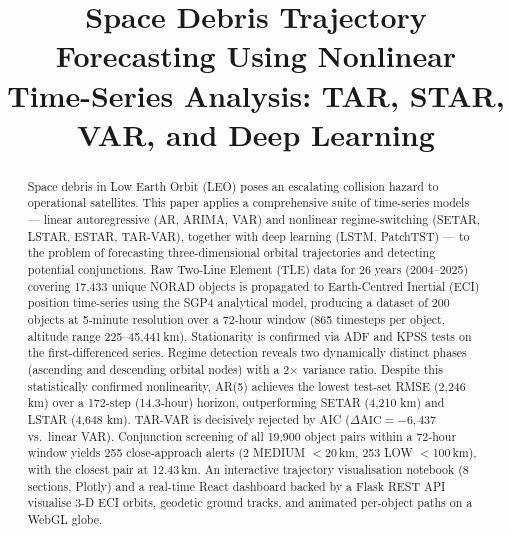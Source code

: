 \documentclass[conference]{IEEEtran}
\begin{document}
\title{Space Debris Trajectory Forecasting Using Nonlinear\\
       Time-Series Analysis: TAR, STAR, VAR, and Deep Learning}

\author{
}

\maketitle

\begin{abstract}
Space debris in Low Earth Orbit (LEO) poses an escalating collision hazard
to operational satellites. This paper applies a comprehensive suite of
time-series models --- linear autoregressive (AR, ARIMA, VAR) and nonlinear
regime-switching (SETAR, LSTAR, ESTAR, TAR-VAR), together with deep learning
(LSTM, PatchTST) --- to the problem of forecasting three-dimensional orbital
trajectories and detecting potential conjunctions. Raw Two-Line Element (TLE)
data for 26 years (2004--2025) covering 17{,}433 unique NORAD objects is
propagated to Earth-Centred Inertial (ECI) position time-series using the
SGP4 analytical model, producing a dataset of 200 objects at 5-minute
resolution over a 72-hour window (865 timesteps per object, altitude range
225--45{,}441\,km). Stationarity is confirmed via ADF and KPSS tests on the
first-differenced series. Regime detection reveals two dynamically distinct
phases (ascending and descending orbital nodes) with a 2$\times$ variance
ratio. Despite this statistically confirmed nonlinearity, AR(5) achieves the
lowest test-set RMSE (2{,}246 km) over a 172-step (14.3-hour) horizon,
outperforming SETAR (4{,}210 km) and LSTAR (4{,}648 km). TAR-VAR is
decisively rejected by AIC ($\Delta\text{AIC}=-6{,}437$ vs.\ linear VAR).
Conjunction screening of all 19{,}900 object pairs within a 72-hour window
yields 255 close-approach alerts (2 MEDIUM $<$20\,km, 253 LOW $<$100\,km),
with the closest pair at 12.43\,km. An interactive trajectory visualisation
notebook (8 sections, Plotly) and a real-time React dashboard backed by a
Flask REST API visualise 3-D ECI orbits, geodetic ground tracks, and
animated per-object paths on a WebGL globe.
\end{abstract}
\end{document}
